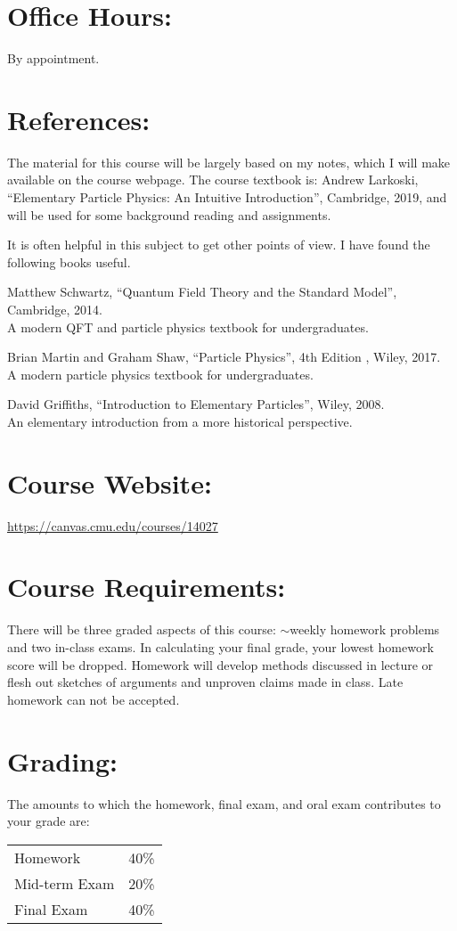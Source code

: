 \documentclass[margin,line]{res}
\begin{document}
\begin{resume}
\section{Office Hours:}
By appointment.



\section{References:}
The material for this course will be largely based on my  notes, which I will make available on the course webpage. 
The course textbook is:
Andrew Larkoski, ``Elementary Particle Physics: An Intuitive Introduction'', Cambridge, 2019,
and will be used for some background reading and assignments. 

It is often helpful in this subject to get other points of view.  
I have found the following books useful. 

Matthew Schwartz, ``Quantum Field Theory and the Standard Model'', Cambridge, 2014.\\
A modern QFT and particle physics textbook for undergraduates.

Brian Martin and Graham Shaw, ``Particle Physics'', 4th Edition , Wiley, 2017.\\
A modern particle physics textbook for undergraduates.

David Griffiths, ``Introduction to Elementary Particles'', Wiley, 2008.\\
An elementary introduction from a more historical perspective.

\section{Course Website:}  
\href{https://canvas.cmu.edu/courses/14027}{https://canvas.cmu.edu/courses/14027}

\newpage

\section{Course Requirements:}
There will be three graded aspects of this course: $\sim$weekly homework problems and two in-class exams.
In calculating your final grade, your lowest homework score will be dropped.
Homework will develop methods discussed in lecture or flesh out sketches of arguments and unproven claims made in class.
Late homework can not be accepted.

\section{Grading:} 
The amounts to which the homework, final exam, and oral exam contributes to
your grade are:
\begin{center}
\begin{tabular}{lc}
Homework & 40\%\\
Mid-term Exam & 20\%\\
Final Exam & 40\%\\
\end{tabular}
\end{center}


\end{resume}
\end{document}
